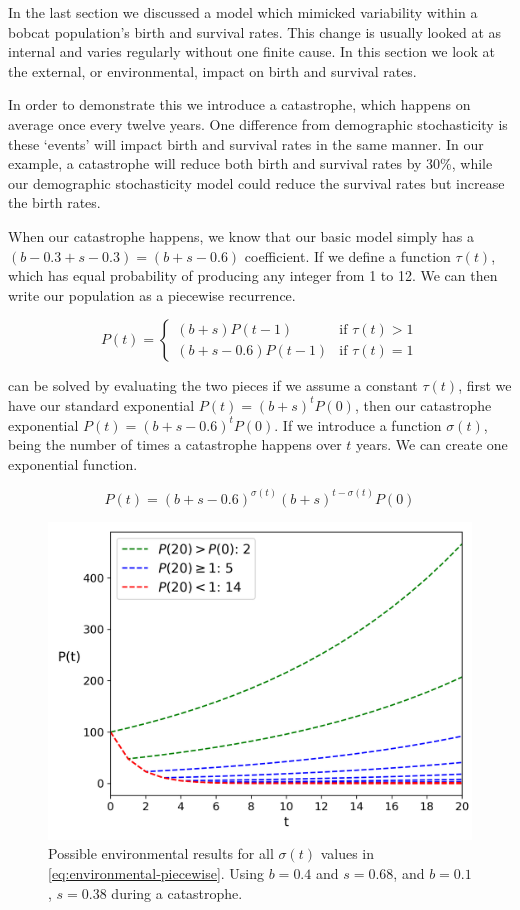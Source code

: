 \documentclass{article}
\begin{document}
In the last section we discussed a model which mimicked variability within a bobcat population's birth and survival rates. This change is usually looked at as internal and varies regularly without one finite cause. In this section we look at the external, or environmental, impact on birth and survival rates.

In order to demonstrate this we introduce a catastrophe, which happens on average once every twelve years. One difference from demographic stochasticity is these `events' will impact birth and survival rates in the same manner. In our example, a catastrophe will reduce both birth and survival rates by 30\%, while our demographic stochasticity model could reduce the survival rates but increase the birth rates.

When our catastrophe happens, we know that our basic model simply has a \\$(b-0.3 + s-0.3)=(b+s - 0.6)$ coefficient. If we define a function $\tau(t)$, which has equal probability of producing any integer from 1 to 12. We can then write our population as a piecewise recurrence.

\begin{equation} \label{eq:environmental-piecewise}
    P(t)=\begin{cases}
        (b+s)P(t-1) & \text{if } \tau(t) > 1 \\
        (b+s-0.6)P(t-1) & \text{if } \tau(t) = 1
    \end{cases}
\end{equation}

 can be solved by evaluating the two pieces if we assume a constant $\tau(t)$, first we have our standard exponential $P(t)=(b+s)^tP(0)$, then our catastrophe exponential $P(t)=(b+s-0.6)^tP(0)$. If we introduce a function $\sigma(t)$, being the number of times a catastrophe happens over $t$ years. We can create one exponential function.

\begin{equation} \label{eq:environmental-exponential}
    P(t) = (b+s-0.6)^{\sigma(t)}(b+s)^{t-\sigma(t)}P(0)
\end{equation}

\begin{figure}[h!]
    \centering
    \includegraphics[width=.5\linewidth]{plots/environmental_classes.png}
    \caption{Possible environmental results for all $\sigma(t)$ values in \cref{eq:environmental-piecewise}. Using $b = 0.4$ and $s = 0.68$, and $b = 0.1$, $s = 0.38$ during a catastrophe.}
    \label{fig:environmental-classes}
\end{figure}
\end{document}
